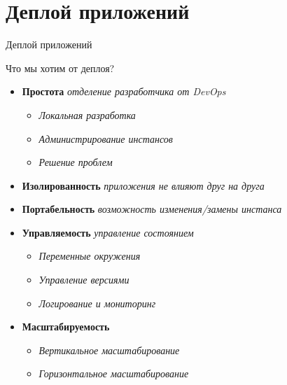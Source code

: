 \section{Деплой приложений}\label{sec:deploy}

\begin{frame}{Деплой приложений}

    Что мы хотим от деплоя?

    \begin {itemize}
    \item \textbf{Простота} \textit{отделение разработчика от DevOps}
    \begin{itemize}
        \item \textit{Локальная разработка}
        \item \textit{Администрирование инстансов}
        \item \textit{Решение проблем}
    \end{itemize}

    \item \textbf{Изолированность} \textit{приложения не влияют друг на друга}
    \item \textbf{Портабельность} \textit{возможность изменения/замены инстанса}
    \item \textbf{Управляемость} \textit{управление состоянием}
    \begin{itemize}
        \item \textit{Переменные окружения}
        \item \textit{Управление версиями}
        \item \textit{Логирование и мониторинг}
    \end{itemize}

    \item \textbf{Масштабируемость}
    \begin{itemize}
        \item \textit{Вертикальное масштабирование}
        \item \textit{Горизонтальное масштабирование}
    \end{itemize}

    \end{itemize}

\end{frame}

